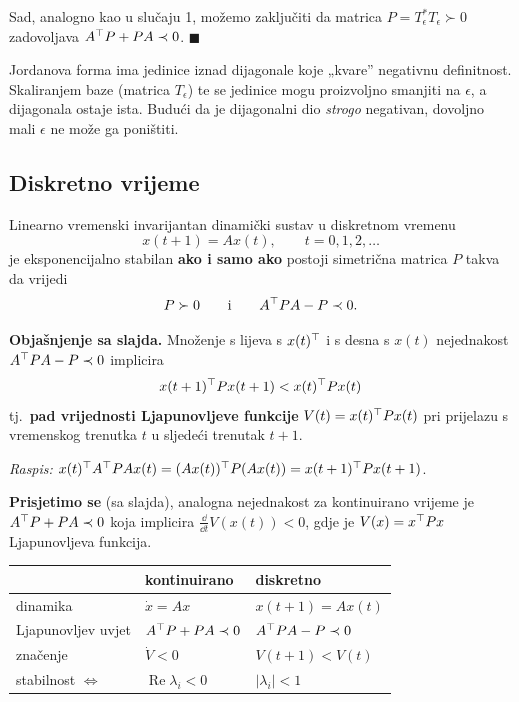 Sad, analogno kao u slučaju 1, možemo zaključiti da matrica
$P = T_\epsilon^{*}T_\epsilon \succ 0$ zadovoljava $A^{\top} P + PA \prec 0$.
$\blacksquare$

\begin{napomena}
Jordanova forma ima jedinice iznad dijagonale koje „kvare” negativnu
definitnost. Skaliranjem baze (matrica $T_\epsilon$) te se jedinice mogu
proizvoljno smanjiti na $\epsilon$, a dijagonala ostaje ista. Budući da je
dijagonalni dio \emph{strogo} negativan, dovoljno mali $\epsilon$ ne može ga
poništiti.
\end{napomena}

\subsection{Diskretno vrijeme}

\begin{teorem}
Linearno vremenski invarijantan dinamički sustav u diskretnom vremenu
\[
x(t+1) = Ax(t), \qquad t = 0,1,2,\dots
\]
je eksponencijalno stabilan \textbf{ako i samo ako} postoji simetrična matrica
$P$ takva da vrijedi
\begin{equation}
\label{eq:ljapunov-diskretno}
P \succ 0 \qquad\text{i}\qquad A^{\top} PA - P \prec 0.
\end{equation}
\end{teorem}

\textbf{Objašnjenje sa slajda.} Množenje s lijeva s $x(t)^{\top}$ i s desna s $x(t)$
nejednakost $A^{\top} PA - P \prec 0$ implicira
\[
x(t+1)^{\top} Px(t+1) < x(t)^{\top} Px(t)
\]
tj.\ \textbf{pad vrijednosti Ljapunovljeve funkcije} $V(t) = x(t)^{\top} Px(t)$ pri
prijelazu s vremenskog trenutka $t$ u sljedeći trenutak $t+1$.

\emph{Raspis:} $x(t)^{\top} A^{\top} PAx(t) = (Ax(t))^{\top} P(Ax(t)) = x(t+1)^{\top} Px(t+1)$.
\checkmark

\textbf{Prisjetimo se} (sa slajda), analogna nejednakost za kontinuirano
vrijeme je $A^{\top} P + PA \prec 0$ koja implicira $\frac{\dd}{\dd t}V(x(t)) < 0$,
gdje je $V(x) = x^{\top} Px$ Ljapunovljeva funkcija.

\begin{center}
\begin{tabular}{lll}
\toprule
& \textbf{kontinuirano} & \textbf{diskretno} \\
\midrule
dinamika & $\dot x = Ax$ & $x(t+1) = Ax(t)$ \\
Ljapunovljev uvjet & $A^{\top} P + PA \prec 0$ & $A^{\top} PA - P \prec 0$ \\
značenje & $\dot V < 0$ & $V(t+1) < V(t)$ \\
stabilnost $\Leftrightarrow$ & $\operatorname{Re}\lambda_i < 0$
  & $|\lambda_i| < 1$ \\
\bottomrule
\end{tabular}
\end{center}

